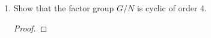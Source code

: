 \documentclass[paper=usletter, fontsize=12pt]{article}
\begin{document}
\begin{itemize}
\begin{enumerate}
\begin{enumerate}
                \item Show that the factor group $G/N$ is cyclic of order 4.
                \begin{proof}
                \end{proof}

            \end{enumerate}

        \end{enumerate}


    \end{itemize}
\end{document}
